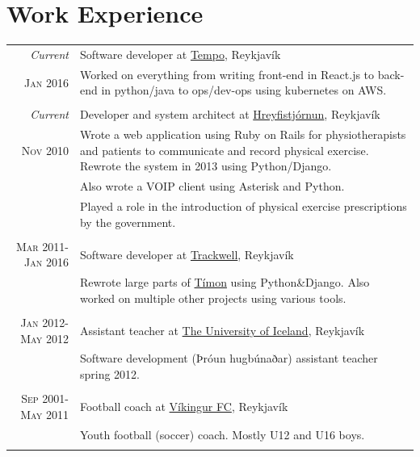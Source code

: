 \documentclass[a4paper,10pt]{article}
\begin{document}
\section{Work Experience}
\begin{tabular}{r|p{10cm}}
 \emph{Current} & Software developer at \href{www.tempo.io}{Tempo}, Reykjavík \\\textsc{Jan 2016}&\footnotesize{Worked on everything from writing front-end in React.js to back-end in python/java to ops/dev-ops using kubernetes on AWS.}\\\multicolumn{2}{c}{} \\

 \emph{Current} & Developer and system architect at \href{www.hreyfistjornun.is}{Hreyfistjórnun}, Reykjavík \\\textsc{Nov 2010}&\footnotesize{Wrote a web application using Ruby on Rails for physiotherapists and patients to communicate and record physical exercise. Rewrote the
system in 2013 using Python/Django.}\\
& \footnotesize{Also wrote a VOIP client using Asterisk and Python.}\\
& \footnotesize{Played a role in the introduction of physical exercise
prescriptions by the government.}\\\multicolumn{2}{c}{} \\

 \textsc{Mar 2011-Jan 2016} & Software developer at \href{www.trackwell.com}{Trackwell}, Reykjavík \\&\footnotesize{Rewrote large parts of \href{www.timon.is}{Tímon} using Python\&Django. Also worked on multiple other projects using various tools.}\\\multicolumn{2}{c}{} \\

 \textsc{Jan 2012-May 2012} & Assistant teacher at \href{www.hi.is}{The University of Iceland}, Reykjavík \\&\footnotesize{Software development (Þróun hugbúnaðar) assistant teacher spring 2012.}\\\multicolumn{2}{c}{} \\

 \textsc{Sep 2001-May 2011} & Football coach at \href{www.vikingur.is}{Víkingur FC}, Reykjavík \\&\footnotesize{Youth football (soccer) coach. Mostly U12 and U16 boys.}\\\multicolumn{2}{c}{} \\

 \end{tabular}
\end{document}
